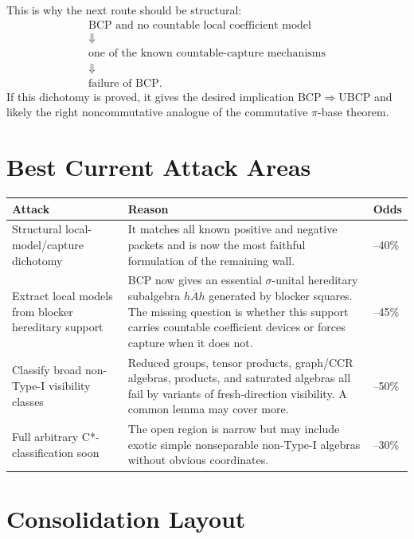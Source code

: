 \documentclass[11pt]{article}
\begin{document}
This is why the next route should be structural:
\[
\begin{array}{c}
\text{BCP and no countable local coefficient model}\\
\Downarrow\\
\text{one of the known countable-capture mechanisms}\\
\Downarrow\\
\text{failure of BCP.}
\end{array}
\]
If this dichotomy is proved, it gives the desired implication
BCP\(\Rightarrow\)UBCP and likely the right noncommutative analogue of the
commutative \(\pi\)-base theorem.

\section*{Best Current Attack Areas}

\begin{center}
\begin{tabular}{>{\raggedright\arraybackslash}p{}
                >{\raggedright\arraybackslash}p{}
                >{\raggedright\arraybackslash}p{}}
\textbf{Attack} & \textbf{Reason} & \textbf{Odds}\\
\hline
Structural local-model/capture dichotomy &
It matches all known positive and negative packets and is now the most
faithful formulation of the remaining wall. &
25--40\%\\[0.8em]
Extract local models from blocker hereditary support &
BCP now gives an essential \(\sigma\)-unital hereditary subalgebra
\(\overline{hAh}\) generated by blocker squares.  The missing question is
whether this support carries countable coefficient devices or forces capture
when it does not. &
30--45\%\\[0.8em]
Classify broad non-Type-I visibility classes &
Reduced groups, tensor products, graph/CCR algebras, products, and saturated
algebras all fail by variants of fresh-direction visibility.  A common lemma
may cover more. &
35--50\%\\[0.8em]
Full arbitrary C*-classification soon &
The open region is narrow but may include exotic simple nonseparable
non-Type-I algebras without obvious coordinates. &
20--30\%
\end{tabular}
\end{center}

\section*{Consolidation Layout}
\end{document}
